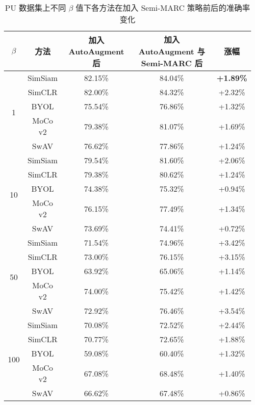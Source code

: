 \documentclass[master]{thesis-uestc}
\begin{document}
\begin{table}[!h]
    \caption{PU 数据集上不同 $\beta$ 值下各方法在加入 Semi-MARC 策略前后的准确率变化}
    \centering
    \renewcommand\arraystretch{1.2}
    \begin{tabular}{ccccc}
    \toprule
    $\beta$ & 方法 & 加入 AutoAugment 后 & 加入 AutoAugment 与 Semi-MARC 后 & 涨幅 \\
    \midrule
    \multirow{5}{*}{1}   
        & SimSiam & 82.15\% & 84.04\% & \textbf{+1.89\%} \\
        & SimCLR  & 82.00\% & 84.32\% & +2.32\% \\
        & BYOL    & 75.54\% & 76.86\% & +1.32\% \\
        & MoCo v2 & 79.38\% & 81.07\% & +1.69\% \\
        & SwAV    & 76.62\% & 77.86\% & +1.24\% \\
    \midrule
    \multirow{5}{*}{10}  
        & SimSiam & 79.54\% & 81.60\% & +2.06\% \\
        & SimCLR  & 79.38\% & 80.62\% & +1.24\% \\
        & BYOL    & 74.38\% & 75.32\% & +0.94\% \\
        & MoCo v2 & 76.15\% & 77.49\% & +1.34\% \\
        & SwAV    & 73.69\% & 74.41\% & +0.72\% \\
    \midrule
    \multirow{5}{*}{50}  
        & SimSiam & 71.54\% & 74.96\% & +3.42\% \\
        & SimCLR  & 73.00\% & 76.15\% & +3.15\% \\
        & BYOL    & 63.92\% & 65.06\% & +1.14\% \\
        & MoCo v2 & 74.00\% & 75.42\% & +1.42\% \\
        & SwAV    & 72.92\% & 76.46\% & +3.54\% \\
    \midrule
    \multirow{5}{*}{100} 
        & SimSiam & 70.08\% & 72.52\% & +2.44\% \\
        & SimCLR  & 70.77\% & 72.65\% & +1.88\% \\
        & BYOL    & 59.08\% & 60.40\% & +1.32\% \\
        & MoCo v2 & 67.08\% & 68.48\% & +1.40\% \\
        & SwAV    & 66.62\% & 67.48\% & +0.86\% \\
    \bottomrule
    \end{tabular}
    \label{tab:longtail_semimarc_comparison_pu}
\end{table}
\end{document}
